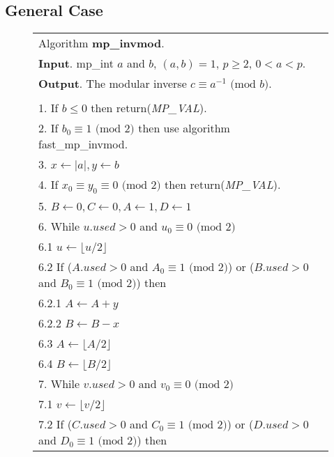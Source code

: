 \documentclass[b5paper]{book}
\begin{document}
\subsection{General Case}
\newpage\begin{figure}[!here]
\begin{small}
\begin{center}
\begin{tabular}{l}
\hline Algorithm \textbf{mp\_invmod}. \\
\textbf{Input}.   mp\_int $a$ and $b$, $(a, b) = 1$, $p \ge 2$, $0 < a < p$.  \\
\textbf{Output}.  The modular inverse $c \equiv a^{-1} \mbox{ (mod }b\mbox{)}$. \\
\hline \\
1.  If $b \le 0$ then return(\textit{MP\_VAL}). \\
2.  If $b_0 \equiv 1 \mbox{ (mod }2\mbox{)}$ then use algorithm fast\_mp\_invmod. \\
3.  $x \leftarrow \vert a \vert, y \leftarrow b$ \\
4.  If $x_0 \equiv y_0  \equiv 0 \mbox{ (mod }2\mbox{)}$ then return(\textit{MP\_VAL}). \\
5.  $B \leftarrow 0, C \leftarrow 0, A \leftarrow 1, D \leftarrow 1$ \\
6.  While $u.used > 0$ and $u_0 \equiv 0 \mbox{ (mod }2\mbox{)}$ \\
\hspace{3mm}6.1  $u \leftarrow \lfloor u / 2 \rfloor$ \\
\hspace{3mm}6.2  If ($A.used > 0$ and $A_0 \equiv 1 \mbox{ (mod }2\mbox{)}$) or ($B.used > 0$ and $B_0 \equiv 1 \mbox{ (mod }2\mbox{)}$) then \\
\hspace{6mm}6.2.1  $A \leftarrow A + y$ \\
\hspace{6mm}6.2.2  $B \leftarrow B - x$ \\
\hspace{3mm}6.3  $A \leftarrow \lfloor A / 2 \rfloor$ \\
\hspace{3mm}6.4  $B \leftarrow \lfloor B / 2 \rfloor$ \\
7.  While $v.used > 0$ and $v_0 \equiv 0 \mbox{ (mod }2\mbox{)}$ \\
\hspace{3mm}7.1  $v \leftarrow \lfloor v / 2 \rfloor$ \\
\hspace{3mm}7.2  If ($C.used > 0$ and $C_0 \equiv 1 \mbox{ (mod }2\mbox{)}$) or ($D.used > 0$ and $D_0 \equiv 1 \mbox{ (mod }2\mbox{)}$) then \\

\end{tabular}
\end{center}
\end{small}
\end{figure}
\end{document}
